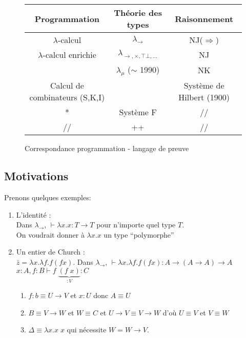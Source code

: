 \documentclass{article}
\newcommand\lterm[2]{\lambda #1. #2}
\newcommand\tlambda[0]{$\lambda$}
\begin{document}
\begin{figure}[h]
\begin{center}
\begin{tabular}{c | c | c}
Programmation & Théorie des types & Raisonnement\\
\hline
\tlambda-calcul & $\lambda_\to$ & NJ($\Rightarrow$) \\
\tlambda-calcul enrichie & $\lambda_{\to,\times,\top\bot,...}$ & NJ\\
 &  $\lambda_\mu$ ($\sim$ 1990) & NK\\
Calcul de combinateurs (S,K,I) &  & Système de Hilbert (1900)\\
\hline
* & Système F & // \\
\hline // & ++ & //\\
\end{tabular}
\caption{Correspondance programmation - langage de preuve}
\end{center}
\end{figure}


\subsection{Motivations}
Prenons quelques exemples:
\begin{enumerate}
\item L'identité :\\
Dans $\lambda_\to$, $\vdash \lterm{x}{x} : T \to T$ pour n'importe quel type $T$.\\
On voudrait donner à $\lterm{x}{x}$ un type ``polymorphe''
\item Un entier de Church :\\
$\bar{z} = \lterm{x}{\lterm{f}{f (f x)}}$. Dans $\lambda_\to$, $\vdash \lterm{x}{\lterm{f}{f (f x)}} : A \to (A \to A) \to A$\\
$x:A, f:B \vdash f\;\underbrace{(f\;x)}_{:V} : C$
\begin{enumerate}[noitemsep]
\item $f:b \equiv U \to V$ et $x : U$ donc $A \equiv U$
\item $B \equiv V \to W$ et $W \equiv C$ et $U \to V \equiv V \to W$ d'où $U \equiv V$ et $V\equiv W$
\item $\Delta \equiv \lterm{x}{x\;x}$ qui nécessite $W=W\to V$.
\end{enumerate}
\end{enumerate}
\end{document}
